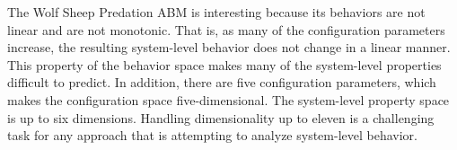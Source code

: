 The Wolf Sheep Predation ABM is interesting because its behaviors are not linear and are not monotonic.
That is, as many of the configuration parameters increase, the resulting system-level behavior does not change in a linear manner.
This property of the behavior space makes many of the system-level properties difficult to predict.
In addition, there are five configuration parameters, which makes the configuration space five-dimensional.
The system-level property space is up to six dimensions.
Handling dimensionality up to eleven is a challenging task for any approach that is attempting to analyze system-level behavior.



